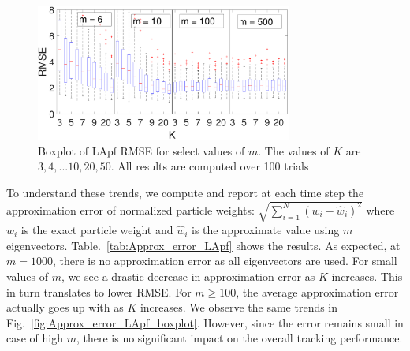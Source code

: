 \documentclass[10pt,letterpaper,final]{article}
\begin{document}
\begin{figure}
\centering
\includegraphics[width=0.75\textwidth]{Figures/RMSE_LApf_boxplot}
\caption{Boxplot of LApf RMSE for select values of $m$. The values of $K$ are $3,4,...10,20,50 $. All results are computed over 100 trials}
\label{fig:RMSE_LApf_boxplot}
\end{figure}

To understand these trends, we compute and report at each time step the approximation error of normalized particle weights: $\sqrt{\sum_{i=1}^N (w_i-\hat{w}_i)^2}$ where $w_i$ is the exact particle weight and $\hat{w}_i$ is the approximate value using $m$ eigenvectors. Table.~\ref{tab:Approx_error_LApf} shows the results. As expected, at $m=1000$, there is no approximation error as all eigenvectors are used. For small values of $m$, we see a drastic decrease in approximation error as $K$ increases. This in turn translates to lower RMSE. For $m\geq 100$, the average approximation error actually goes up with as $K$ increases. We observe the same trends in Fig.~\ref{fig:Approx_error_LApf_boxplot}. However, since the error remains small in case of high $m$, there is no significant impact on the overall tracking performance. 
\end{document}
